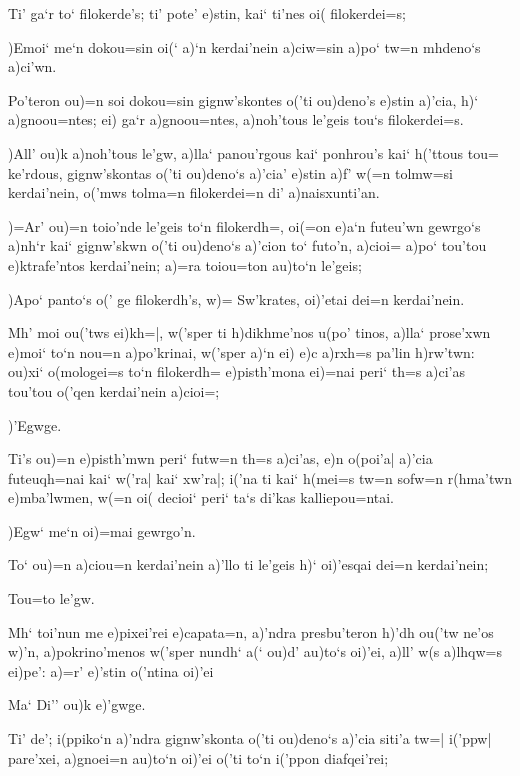 \documentclass[11pt]{book}
\newcommand {\Spag} {\Npag*{=+1}\Npar{1}\numerus{1}}
\newcommand {\Spar} {\Npar*{=+1}\numerus{1}}
\begin{document}
%
%
\1 \Spar Ti' ga`r to` filokerde's; ti' pote' e)stin, kai` ti'nes oi( filokerdei=s;

\2 )Emoi` me`n dokou=sin oi(` a)`n kerdai'nein a)ciw=sin a)po` tw=n mhdeno`s
a)ci'wn.

\1 Po'teron ou)=n soi dokou=sin gignw'skontes o('ti ou)deno's e)stin a)'cia, h)`
a)gnoou=ntes; ei) ga`r a)gnoou=ntes, a)noh'tous le'geis tou`s filokerdei=s.


\2 )All' ou)k a)noh'tous le'gw, a)lla` panou'rgous kai` \Spar %
ponhrou's kai` h('ttous tou= ke'rdous, gignw'skontas o('ti ou)deno`s
a)'cia' e)stin a)f' w(=n tolmw=si kerdai'nein, o('mws tolma=n filokerdei=n di'
a)naisxunti'an.

\1 )=Ar' ou)=n toio'nde le'geis to`n filokerdh=, oi(=on e)a`n futeu'wn gewrgo`s
a)nh`r kai` gignw'skwn o('ti ou)deno`s a)'cion to` futo'n, a)cioi= a)po`
tou'tou e)ktrafe'ntos kerdai'nein; a)=ra toiou=ton au)to`n le'geis;

\2 )Apo` panto`s o(' ge filokerdh's, w)= Sw'krates, oi)'etai dei=n kerdai'nein.

\1 Mh' moi ou('tws ei)kh=|, w('sper ti h)dikhme'nos u(po' tinos,
\Spar %
 a)lla` prose'xwn e)moi` to`n nou=n a)po'krinai, w('sper a)`n ei) e)c
a)rxh=s pa'lin h)rw'twn: ou)xi` o(mologei=s to`n filokerdh= e)pisth'mona
ei)=nai peri` th=s a)ci'as tou'tou o('qen kerdai'nein a)cioi=;

\2 )'Egwge.

\1 Ti's ou)=n e)pisth'mwn peri` futw=n th=s a)ci'as, e)n o(poi'a| a)'cia
futeuqh=nai kai` w('ra| kai` xw'ra|; i('na ti kai` h(mei=s tw=n sofw=n
r(hma'twn e)mba'lwmen, w(=n oi( decioi` peri` ta`s di'kas kalliepou=ntai.

\2 \Spar )Egw` me`n oi)=mai gewrgo'n.

\1 To` ou)=n a)ciou=n kerdai'nein a)'llo ti le'geis h)` oi)'esqai dei=n
kerdai'nein;

\2 Tou=to le'gw.

\1 Mh` toi'nun me e)pixei'rei e)capata=n, a)'ndra presbu'teron
\Spag %
h)'dh ou('tw ne'os w)'n, a)pokrino'menos w('sper nundh` a(` ou)d'
au)to`s oi)'ei, a)ll' w(s a)lhqw=s ei)pe': a)=r' e)'stin o('ntina oi)'ei

\2 Ma` Di'' ou)k e)'gwge.

\1 Ti' de'; i(ppiko`n a)'ndra gignw'skonta o('ti ou)deno`s a)'cia siti'a tw=|
i('ppw| pare'xei, a)gnoei=n au)to`n oi)'ei o('ti to`n i('ppon diafqei'rei;
\end{document}
